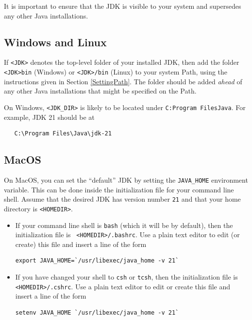 \documentclass{article}
\begin{document}
It is important to ensure that the JDK is visible to your system and
supersedes any other Java installations.

\subsection{Windows and Linux}

If {\tt <JDK>} denotes the top-level folder of your installed JDK,
then add the folder {\tt <JDK>\BKS bin} (Windows) or {\tt <JDK>/bin}
(Linux) to your system Path, using the instructions given in Section
\ref{SettingPath}. The folder should be added {\it ahead} of any other
Java installations that might be specified on the Path.

On Windows, {\tt <JDK\_DIR>} is likely to be located under {\tt C:\BKS Program
Files\BKS Java}. For example, JDK 21 should be at
\begin{verbatim}
   C:\Program Files\Java\jdk-21
\end{verbatim}

\subsection{MacOS}

On MacOS, you can set the ``default'' JDK by setting the {\tt JAVA\_HOME}
environment variable.  This can be done inside the initialization file for your
command line shell.  Assume that the desired JDK has version number {\tt 21}
and that your home directory is {\tt <HOMEDIR>}.

\begin{itemize}

\item If your command line shell is {\tt bash} (which
it will be by default), then the initialization file is {\tt
<HOMEDIR>/.bashrc}. Use a plain text editor to edit (or create) this file and
insert a line of the form
%
\begin{lstlisting}[]
  export JAVA_HOME=`/usr/libexec/java_home -v 21`
\end{lstlisting}
%

\item If you have changed your shell to {\tt csh} or {\tt tcsh},
then the initialization file is {\tt <HOMEDIR>/.cshrc}. Use a plain text editor
to edit or create this file and insert a line of the form
%
\begin{lstlisting}[]
  setenv JAVA_HOME `/usr/libexec/java_home -v 21`
\end{lstlisting}
%

\end{itemize}
\end{document}
